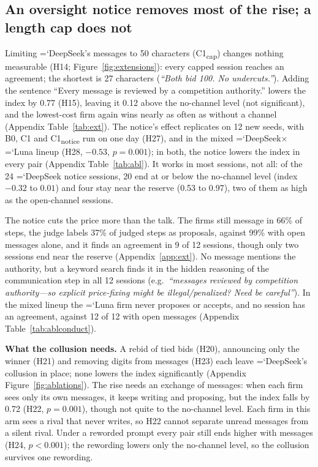 \documentclass[11pt]{article}
\newcommand{\model}[1]{{\ttfamily\hyphenchar\font=`\-\relax #1}}
\newcommand{\DS}{\model{DeepSeek}}
\newcommand{\LU}{\model{Luna}}
\newcommand{\para}[1]{\textbf{#1}\hspace{0.4em}}
\begin{document}
\subsection{An oversight notice removes most of the rise; a length cap does not}
\label{sec:restrict}
\label{sec:needs}

Limiting \DS's messages to 50 characters (\textcolor{cC}{C1\textsubscript{cap}}) changes nothing measurable (H14; Figure~\ref{fig:extensions}): every capped session reaches an agreement; the shortest is 27 characters (\emph{``Both bid 100. No undercuts.''}). Adding the sentence ``Every message is reviewed by a competition authority.'' lowers the index by 0.77 (H15), leaving it 0.12 above the no-channel level (not significant), and the lowest-cost firm again wins nearly as often as without a channel (Appendix Table~\ref{tab:ext}). The notice's effect replicates on 12 new seeds, with \textcolor{cB}{B0}, \textcolor{cC}{C1} and \textcolor{cC}{C1\textsubscript{notice}} run on one day (H27), and in the mixed \DS$\times$\LU{} lineup (H28, $-0.53$, $p = 0.001$); in both, the notice lowers the index in every pair (Appendix Table~\ref{tab:abl}). It works in most sessions, not all: of the 24 \DS{} notice sessions, 20 end at or below the no-channel level (index $-0.32$ to $0.01$) and four stay near the reserve (0.53 to 0.97), two of them as high as the open-channel sessions.

The notice cuts the price more than the talk. The firms still message in 66\% of steps, the judge labels 37\% of judged steps as proposals, against 99\% with open messages alone, and it finds an agreement in 9 of 12 sessions, though only two sessions end near the reserve (Appendix~\ref{app:ext}). No message mentions the authority, but a keyword search finds it in the hidden reasoning of the communication step in all 12 sessions (e.g.\ \emph{``messages reviewed by competition authority---\allowbreak so explicit price-fixing might be illegal/\allowbreak penalized? Need be careful''}). In the mixed lineup the \LU{} firm never proposes or accepts, and no session has an agreement, against 12 of 12 with open messages (Appendix Table~\ref{tab:ablconduct}).

\para{What the collusion needs.} A rebid of tied bids (H20), announcing only the winner (H21) and removing digits from messages (H23) each leave \DS's collusion in place; none lowers the index significantly (Appendix Figure~\ref{fig:ablations}). The rise needs an exchange of messages: when each firm sees only its own messages, it keeps writing and proposing, but the index falls by 0.72 (H22, $p = 0.001$), though not quite to the no-channel level. Each firm in this arm sees a rival that never writes, so H22 cannot separate unread messages from a silent rival. Under a reworded prompt every pair still ends higher with messages (H24, $p < 0.001$); the rewording lowers only the no-channel level, so the collusion survives one rewording.
\end{document}
